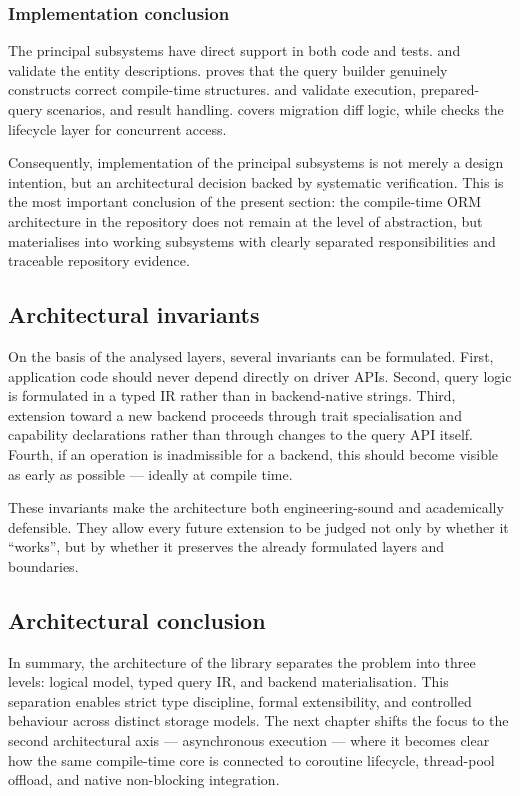 \subsubsection{Implementation conclusion}

The principal subsystems have direct support in both code and tests.  and  validate the entity descriptions.  proves that the query builder genuinely constructs correct compile-time structures.  and  validate execution, prepared-query scenarios, and result handling.  covers migration diff logic, while  checks the lifecycle layer for concurrent access.

Consequently, implementation of the principal subsystems is not merely a design intention, but an architectural decision backed by systematic verification. This is the most important conclusion of the present section: the compile-time ORM architecture in the repository does not remain at the level of abstraction, but materialises into working subsystems with clearly separated responsibilities and traceable repository evidence.

\subsection{Architectural invariants}

On the basis of the analysed layers, several invariants can be formulated. First, application code should never depend directly on driver APIs. Second, query logic is formulated in a typed IR rather than in backend-native strings. Third, extension toward a new backend proceeds through trait specialisation and capability declarations rather than through changes to the query API itself. Fourth, if an operation is inadmissible for a backend, this should become visible as early as possible --- ideally at compile time.

These invariants make the architecture both engineering-sound and academically defensible. They allow every future extension to be judged not only by whether it ``works'', but by whether it preserves the already formulated layers and boundaries.

\subsection{Architectural conclusion}

In summary, the architecture of the library separates the problem into three levels: logical model, typed query IR, and backend materialisation. This separation enables strict type discipline, formal extensibility, and controlled behaviour across distinct storage models. The next chapter shifts the focus to the second architectural axis --- asynchronous execution --- where it becomes clear how the same compile-time core is connected to coroutine lifecycle, thread-pool offload, and native non-blocking integration.
